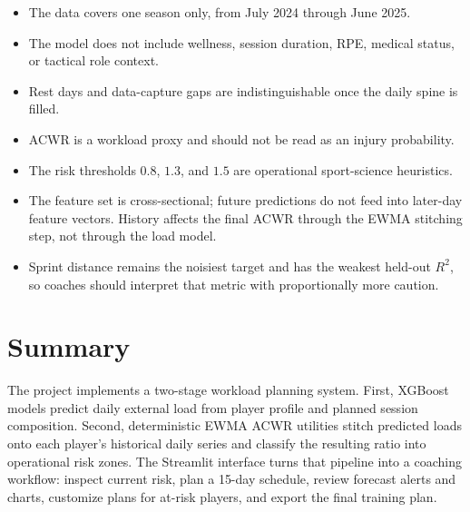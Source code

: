 \documentclass[11pt,a4paper]{article}
\begin{document}
\begin{itemize}
  \item The data covers one season only, from July 2024 through June 2025.
  \item The model does not include wellness, session duration, RPE, medical status, or tactical role context.
  \item Rest days and data-capture gaps are indistinguishable once the daily spine is filled.
  \item ACWR is a workload proxy and should not be read as an injury probability.
  \item The risk thresholds \(0.8\), \(1.3\), and \(1.5\) are operational sport-science heuristics.
  \item The feature set is cross-sectional; future predictions do not feed into later-day feature vectors. History affects the final ACWR through the EWMA stitching step, not through the load model.
  \item Sprint distance remains the noisiest target and has the weakest held-out \(R^2\), so coaches should interpret that metric with proportionally more caution.
\end{itemize}

\section{Summary}

The project implements a two-stage workload planning system. First, XGBoost models predict daily external load from player profile and planned session composition. Second, deterministic EWMA ACWR utilities stitch predicted loads onto each player's historical daily series and classify the resulting ratio into operational risk zones. The Streamlit interface turns that pipeline into a coaching workflow: inspect current risk, plan a 15-day schedule, review forecast alerts and charts, customize plans for at-risk players, and export the final training plan.
\end{document}
